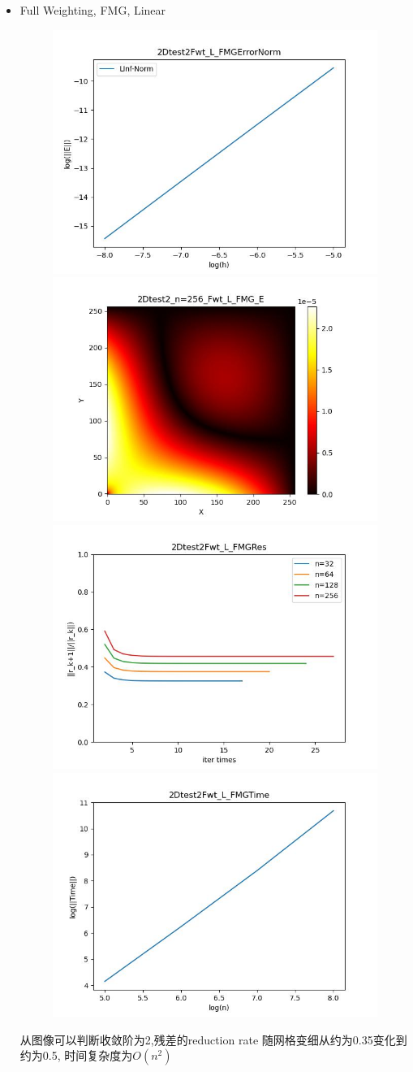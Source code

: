 \documentclass{article}
\begin{document}
\begin{itemize}
    \item Full Weighting, FMG, Linear
    \begin{figure}[h]
        \centering
        \includegraphics[width=0.35\linewidth]{2Dtest2Fwt_L_FMGErrorNorm.jpg}
        \includegraphics[width=0.35\linewidth]{2Dtest2_n=256_Fwt_L_FMG_E.jpg}
        \includegraphics[width=0.35\linewidth]{2Dtest2Fwt_L_FMGRes.jpg}
        \includegraphics[width=0.35\linewidth]{2Dtest2Fwt_L_FMGTime.jpg}
    \end{figure}
    
    从图像可以判断收敛阶为2,残差的reduction rate 随网格变细从约为0.35变化到约为0.5, 时间复杂度为$O(n^2)$
    

\end{itemize}
\end{document}
